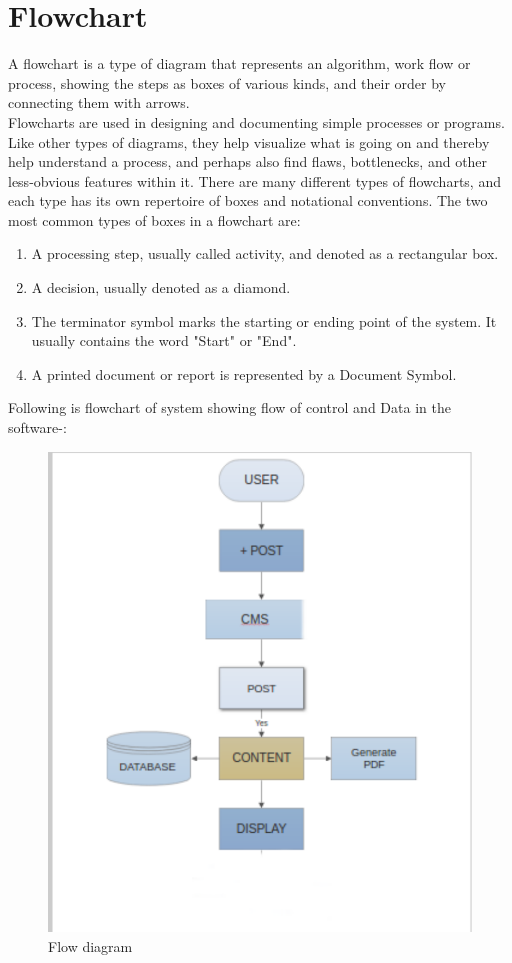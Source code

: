 \section{Flowchart}
A flowchart is a type of diagram that represents an algorithm, work flow or process, showing the steps as boxes of various kinds, and their order by connecting them with arrows. \\
Flowcharts are used in designing and documenting simple processes or programs. Like other types of diagrams, they help visualize what is going on and thereby help understand a process, and perhaps also find flaws, bottlenecks, and other less-obvious features within it. There are many different types of flowcharts, and each type has its own repertoire of boxes and notational conventions. The two most common types of boxes in a flowchart are:
\begin{enumerate}
\item A processing step, usually called activity, and denoted as a rectangular box.
\item A decision, usually denoted as a diamond.
\item The terminator symbol marks the starting or ending point of the system. It usually contains the word "Start" or "End".
\item A printed document or report is represented by a Document Symbol.
\end{enumerate}
Following is flowchart of system showing flow of control and Data in the software-:
\newpage
\begin{figure}[h!]
\centering \includegraphics[scale=0.9]{input/images/fc.pdf}
\caption{ Flow diagram}
\label{fig:UI1}
\end{figure}

